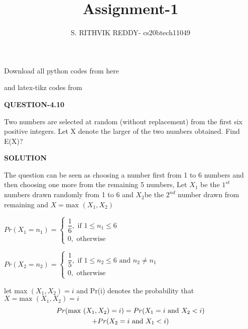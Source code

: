 \documentclass[a4paper]{article}
\title{Assignment-1}
\author{S. RITHVIK REDDY- cs20btech11049}
\date{}
\begin{document}
\maketitle
\noindent
Download all python codes from here

\begin{multicols*}{2}
\noindent
{}
    
\vspace{0.3cm}
and latex-tikz codes from  

\vspace{0.3cm}  
    
   
\vspace{0.5cm}
\textbf{QUESTION-4.10}
\vspace{0.5cm}

Two numbers are selected at random (without replacement) from the first six positive integers. Let X denote the larger of the two numbers obtained. Find E(X)?



\vspace{0.5cm}
\textbf{SOLUTION}
\vspace{0.5cm}

The question can be seen as choosing a number first from 1 to 6 numbers and then choosing one more from the remaining 5 numbers, Let $X_1$ be the $1^{st}$ numbers drawn randomly from 1 to 6 and $X_2$be the $2^{nd}$ number drawn from remaining and $X = \text{max } (X_1,X_2)$

\vspace{0.3cm}
$Pr(X_1=n_1)= \begin{cases}
\dfrac{1}{6},  \text{ if } 1 \leq n_1 \leq 6\\
0,  \text{  otherwise }
\end{cases}$

\vspace{0.3cm}
$Pr(X_2=n_2)= \begin{cases}
\dfrac{1}{5},  \text{ if } 1 \leq n_2 \leq 6 \text{ and }n_2 \neq n_1\\
0,  \text{  otherwise }
\end{cases}$

let max $(X_1,X_2)=i$ and Pr(i) denotes the probability that $X = \text{max } (X_1,X_2)=i$
 \begin{multline}
 \noindent
Pr(\text{max } (X_1,X_2)=i)=Pr(X_1=i\text{ and }X_2<i)\\
 +Pr(X_2=i\text{ and }X_1<i) \label{eqn_(0.0.1)}
\end{multline}
 


\end{multicols*}
\end{document}

